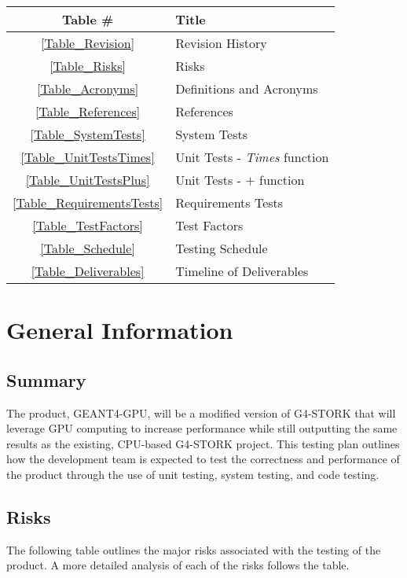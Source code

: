 \documentclass[12pt]{article}
\begin{document}
\begin{center}
\begin{tabular}{cl}
\toprule

\bf Table \# & \bf Title\\\midrule
\ref{Table_Revision} & Revision History\\
\ref{Table_Risks} & Risks\\
\ref{Table_Acronyms} & Definitions and Acronyms\\
\ref{Table_References} & References\\
\ref{Table_SystemTests} & System Tests\\
\ref{Table_UnitTestsTimes} & Unit Tests - \emph{Times} function\\
\ref{Table_UnitTestsPlus} & Unit Tests - $+$ function\\
\ref{Table_RequirementsTests} & Requirements Tests\\
\ref{Table_TestFactors} & Test Factors\\
\ref{Table_Schedule} & Testing Schedule\\
\ref{Table_Deliverables} & Timeline of Deliverables\\

\bottomrule
\end{tabular}
\end{center}


\section{General Information}

\subsection{Summary} %
The product, GEANT4-GPU, will be a modified version of G4-STORK that will leverage GPU computing to increase performance while still outputting the same results as the existing, CPU-based G4-STORK project. This testing plan outlines how the development team is expected to test the correctness and performance of the product through the use of unit testing, system testing, and code testing.
\newpage
\subsection{Risks} %
The following table outlines the major risks associated with the testing of the product. A more detailed analysis of each of the risks follows the table.
\end{document}
